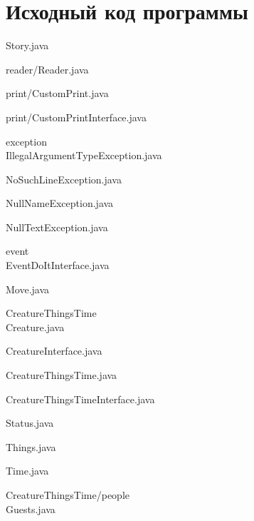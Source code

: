 \documentclass[12pt,onecolumn]{article}
\begin{document}
\section{Исходный код программы}
Story.java

reader/Reader.java

print/CustomPrint.java

print/CustomPrintInterface.java

exception\\
IllegalArgumentTypeException.java

NoSuchLineException.java

NullNameException.java

NullTextException.java

event\\
EventDoItInterface.java

Move.java

CreatureThingsTime\\
Creature.java

CreatureInterface.java

CreatureThingsTime.java

CreatureThingsTimeInterface.java

Status.java

Things.java

Time.java

CreatureThingsTime/people\\
Guests.java

\end{document}
